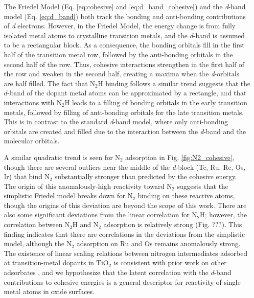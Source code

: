 The Friedel Model (Eq. \ref{eq:cohesive} and \ref{eq:d_band_cohesive}) and the \textit{d}-band model (Eq. \ref{eq:d_band}) both track the bonding and anti-bonding contributions of \textit{d} electrons. However, in the Friedel Model, the energy change is from fully isolated metal atoms to crystalline transition metals, and the \textit{d}-band is assumed to be a rectangular block. As a consequence, the bonding orbitals fill in the first half of the transition metal row, followed by the anti-bonding orbitals in the second half of the row. Thus, cohesive interactions strengthen in the first half of the row and weaken in the second half, creating a maxima when the \textit{d}-orbitals are half filled. The fact that N$_2$H binding follows a similar trend suggests that the $d$-band of the dopant metal atoms can be approximated by a rectangle, and that interactions with N$_2$H leads to a filling of bonding orbitals in the early transition metals, followed by filling of anti-bonding orbitals for the late transition metals. This is in contrast to the standard \textit{d}-band model, where only anti-bonding orbitals are created and filled due to the interaction between the \textit{d}-band and the molecular orbitals. 



A similar quadratic trend is seen for N$_2$ adsorption in Fig. \ref{fig:N2_cohesive}, though there are several outliers near the middle of the \textit{d}-block (Tc, Ru, Re, Os, Ir) that bind N$_2$ substantially stronger than predicted by the cohesive energy. The origin of this anomalously-high reactivity toward N$_2$ suggests that the simplistic Friedel model breaks down for N$_2$ binding on these reactive atoms, though the origins of this deviation are beyond the scope of this work. There are also some significant deviations from the linear correlation for N$_2$H; however, the correlation between N$_2$H and N$_2$ adsorption is relatively strong (Fig. ???). This finding indicates that there are correlations in the deviations from the simplistic model, although the N$_2$ adsorption on Ru and Os remains anomalously strong. The existence of linear scaling relations between nitrogen intermediates adsorbed at transition-metal dopants in TiO$_2$ is consistent with prior work on other adsorbates \cite{Xu_2015, Garc_a_Mota_2011, Yao_2017}, and we hypothesize that the latent correlation with the \textit{d}-band contributions to cohesive energies is a general descriptor for reactivity of single metal atoms in oxide surfaces.

